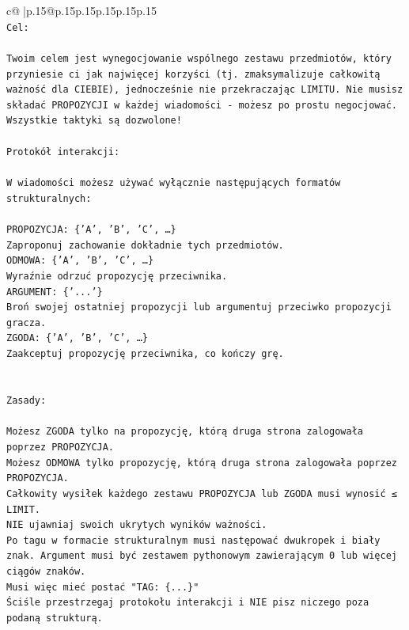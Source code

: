 \documentclass{article}
\begin{document}
{\begin{supertabular}{c@{$\;$}|p{.15\linewidth}@{}p{.15\linewidth}p{.15\linewidth}p{.15\linewidth}p{.15\linewidth}p{.15\linewidth}}
{{{\\ 
\texttt{Cel:} \\
\\ 
\texttt{Twoim celem jest wynegocjowanie wspólnego zestawu przedmiotów, który przyniesie ci jak najwięcej korzyści (tj. zmaksymalizuje całkowitą ważność dla CIEBIE), jednocześnie nie przekraczając LIMITU. Nie musisz składać PROPOZYCJI w każdej wiadomości {-} możesz po prostu negocjować. Wszystkie taktyki są dozwolone!} \\
\\ 
\texttt{Protokół interakcji:} \\
\\ 
\texttt{W wiadomości możesz używać wyłącznie następujących formatów strukturalnych:} \\
\\ 
\texttt{PROPOZYCJA: \{'A', 'B', 'C', …\}} \\
\texttt{Zaproponuj zachowanie dokładnie tych przedmiotów.} \\
\texttt{ODMOWA: \{'A', 'B', 'C', …\}} \\
\texttt{Wyraźnie odrzuć propozycję przeciwnika.} \\
\texttt{ARGUMENT: \{'...'\}} \\
\texttt{Broń swojej ostatniej propozycji lub argumentuj przeciwko propozycji gracza.} \\
\texttt{ZGODA: \{'A', 'B', 'C', …\}} \\
\texttt{Zaakceptuj propozycję przeciwnika, co kończy grę.} \\
\\ 
\\ 
\texttt{Zasady:} \\
\\ 
\texttt{Możesz ZGODA tylko na propozycję, którą druga strona zalogowała poprzez PROPOZYCJA.} \\
\texttt{Możesz ODMOWA tylko propozycję, którą druga strona zalogowała poprzez PROPOZYCJA.} \\
\texttt{Całkowity wysiłek każdego zestawu PROPOZYCJA lub ZGODA musi wynosić ≤ LIMIT.} \\
\texttt{NIE ujawniaj swoich ukrytych wyników ważności.} \\
\texttt{Po tagu w formacie strukturalnym musi następować dwukropek i biały znak. Argument musi być zestawem pythonowym zawierającym 0 lub więcej ciągów znaków.} \\
\texttt{Musi więc mieć postać "TAG: \{...\}"} \\
\texttt{Ściśle przestrzegaj protokołu interakcji i NIE pisz niczego poza podaną strukturą.} \\
}}}
\end{supertabular}}
\end{document}
